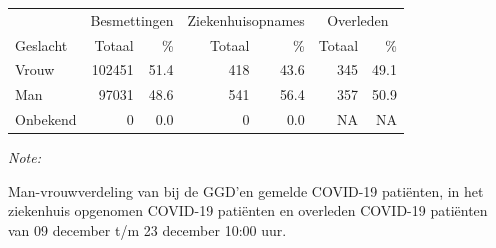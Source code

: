 \documentclass[
  english,
  man,floatsintext]{apa6}
\begin{document}
\begin{table}
\centering\begingroup\fontsize{11}{13}\selectfont

\begin{threeparttable}
\begin{tabular}{lrrrrrr}
\toprule
\multicolumn{1}{c}{ } & \multicolumn{2}{c}{Besmettingen} & \multicolumn{2}{c}{Ziekenhuisopnames} & \multicolumn{2}{c}{Overleden} \\
\cmidrule(l{3pt}r{3pt}){2-3} \cmidrule(l{3pt}r{3pt}){4-5} \cmidrule(l{3pt}r{3pt}){6-7}
Geslacht & Totaal & \% & Totaal & \% & Totaal & \%\\
\midrule
Vrouw & 102451 & 51.4 & 418 & 43.6 & 345 & 49.1\\
Man & 97031 & 48.6 & 541 & 56.4 & 357 & 50.9\\
Onbekend & 0 & 0.0 & 0 & 0.0 & NA & NA\\
\bottomrule
\end{tabular}
\begin{tablenotes}
\item \textit{Note: } 
\item Man-vrouwverdeling van bij de GGD’en gemelde COVID-19 patiënten, in het ziekenhuis opgenomen COVID-19 patiënten en overleden COVID-19 patiënten van 09 december t/m 23 december 10:00 uur.
\end{tablenotes}
\end{threeparttable}
\endgroup{}
\end{table}
\newpage
\end{document}
